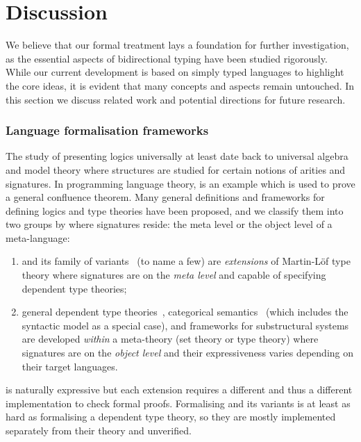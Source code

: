
\section{Discussion} \label{sec:future}
We believe that our formal treatment lays a foundation for further investigation, as the essential aspects of bidirectional typing have been studied rigorously. 
While our current development is based on simply typed languages to highlight the core ideas, it is evident that many concepts and aspects remain untouched.
In this section we discuss related work and potential directions for future research.
\subsubsection{Language formalisation frameworks}

The study of presenting logics universally at least date back to universal algebra and model theory where structures are studied for certain notions of arities and signatures.
In programming language theory,  is an example which is used to prove a general confluence theorem.
Many general definitions and frameworks for defining logics and type theories have been proposed, and we classify them into two groups by where signatures reside: the meta level or the object level of a meta-language:
\begin{enumerate}
\item {} and its family of variants~\cite{Harper2007,Assaf2016,Felicissimo2023} (to name a few) are \emph{extensions} of Martin-L\"of type theory where signatures are on the \emph{meta level} and capable of specifying dependent type theories;
\item general dependent type theories~\cite{Bauer2020,Haselwarter2021,Bauer2022a,Uemura2021}, categorical semantics~\cite{Fiore1999,Tanaka2006,Tanaka2006a,Fiore2010,Hamana2011,Fiore2013,Arkor2020,Fiore2022} (which includes the syntactic model as a special case), and frameworks for substructural systems~\cite{Tanaka2006,Tanaka2006a,Wood2022} are developed \emph{within} a meta-theory (set theory or type theory) where signatures are on the \emph{object level} and their expressiveness varies depending on their target languages.
\end{enumerate}

\LF is naturally expressive but each extension requires a different \LF and thus a different implementation to check formal \LF proofs.
Formalising \LF and its variants is at least as hard as formalising a dependent type theory, so they are mostly implemented separately from their theory and unverified.

